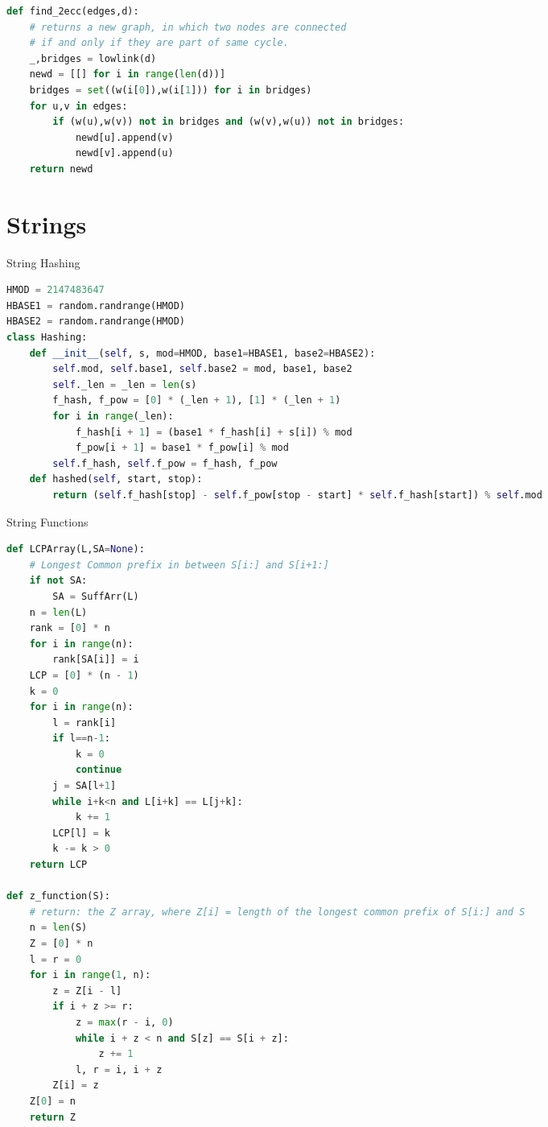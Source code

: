 \documentclass[10pt,landscape, a4paper]{article}
\begin{document}
\begin{multicols*}{3}
\begin{lstlisting}[language=Python]
def find_2ecc(edges,d):
    # returns a new graph, in which two nodes are connected
    # if and only if they are part of same cycle.
    _,bridges = lowlink(d)
    newd = [[] for i in range(len(d))]
    bridges = set((w(i[0]),w(i[1])) for i in bridges)
    for u,v in edges:
        if (w(u),w(v)) not in bridges and (w(v),w(u)) not in bridges:
            newd[u].append(v)
            newd[v].append(u)
    return newd
\end{lstlisting}


\section{Strings}

String Hashing
\begin{lstlisting}[language=Python]
HMOD = 2147483647
HBASE1 = random.randrange(HMOD)
HBASE2 = random.randrange(HMOD)
class Hashing:
    def __init__(self, s, mod=HMOD, base1=HBASE1, base2=HBASE2):
        self.mod, self.base1, self.base2 = mod, base1, base2
        self._len = _len = len(s)
        f_hash, f_pow = [0] * (_len + 1), [1] * (_len + 1)
        for i in range(_len):
            f_hash[i + 1] = (base1 * f_hash[i] + s[i]) % mod
            f_pow[i + 1] = base1 * f_pow[i] % mod
        self.f_hash, self.f_pow = f_hash, f_pow
    def hashed(self, start, stop):
        return (self.f_hash[stop] - self.f_pow[stop - start] * self.f_hash[start]) % self.mod

\end{lstlisting}

String Functions
\begin{lstlisting}[language=Python]
def LCPArray(L,SA=None):
    # Longest Common prefix in between S[i:] and S[i+1:]
    if not SA:
        SA = SuffArr(L)
    n = len(L)
    rank = [0] * n
    for i in range(n):
        rank[SA[i]] = i
    LCP = [0] * (n - 1)
    k = 0
    for i in range(n):
        l = rank[i]
        if l==n-1:
            k = 0
            continue
        j = SA[l+1]
        while i+k<n and L[i+k] == L[j+k]:
            k += 1
        LCP[l] = k
        k -= k > 0
    return LCP

def z_function(S):
    # return: the Z array, where Z[i] = length of the longest common prefix of S[i:] and S
    n = len(S)
    Z = [0] * n
    l = r = 0
    for i in range(1, n):
        z = Z[i - l]
        if i + z >= r:
            z = max(r - i, 0)
            while i + z < n and S[z] == S[i + z]:
                z += 1
            l, r = i, i + z
        Z[i] = z
    Z[0] = n
    return Z


\end{lstlisting}
\end{multicols*}
\end{document}
